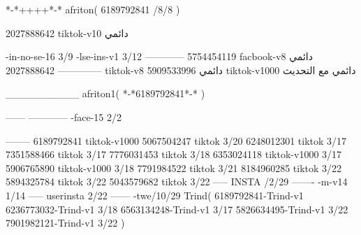 *-*++++*-*
afriton(
6189792841 /8/8
)

2027888642 tiktok-v10
دائمي

-in-no-se-16 3/9
-lse-ins-v1 3/12
------------
5754454119 facbook-v8
دائمي
--------------
2027888642 tiktok-v8
دائمي
5909533996 tiktok-v1000
دائمي مع التحديث

__________
afriton1(
*-*6189792841*-*
)


------
------------
-face-15 2/2

--------
6189792841 tiktok-v1000
5067504247 tiktok 3/20
6248012301 tiktok 3/17
7351588466 tiktok 3/17
7776031453 tiktok 3/18
6353024118 tiktok-v1000 3/17
5906765890 tiktok-v1000 3/18
7791984522 tiktok 3/21
8184960285 tiktok 3/22
5894325784 tiktok 3/22
5043579682 tiktok 3/22
-----
 INSTA /2/29
-------
-m-v14 1/14
-----
userinsta 2/22
------
-twe/10/29
Trind(
6189792841-Trind-v1 
6236773032-Trind-v1 3/18
6563134248-Trind-v1 3/17
5826634495-Trind-v1 3/22
7901982121-Trind-v1 3/22
)

